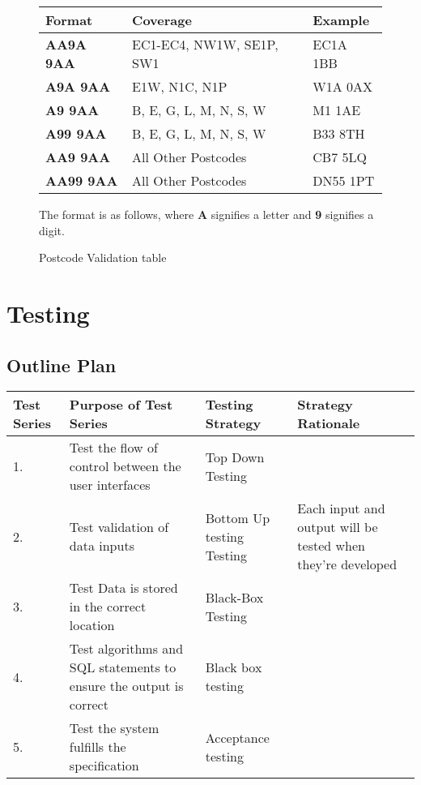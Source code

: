 \begin{python}
\pagebreak


\begin{figure}[H]
\caption{Postcode Validation table} \label{fig: Postcode Validation table}
\begin{tabular}{|p{2cm}|p{3cm}|p{2cm}|}
        \hline
        \textbf{Format} & \textbf{Coverage} & \textbf{Example} \\ \hline
        \textbf{AA9A 9AA} & EC1-EC4, NW1W, SE1P, SW1 & EC1A 1BB \\ \hline
        \textbf{A9A 9AA} & E1W, N1C, N1P & W1A 0AX \\ \hline
        \textbf{A9 9AA} & B, E, G, L, M, N, S, W & M1 1AE \\ \hline
         \textbf{A99 9AA} & B, E, G, L, M, N, S, W & B33 8TH \\ \hline
         \textbf{AA9 9AA} & All Other Postcodes & CB7 5LQ \\ \hline
         \textbf{AA99 9AA} & All Other Postcodes & DN55 1PT \\ \hline
  \end{tabular}
\par
\par
  The format is as follows, where \textbf{A} signifies a letter and \textbf{9} signifies a digit.
\end{figure}



\section{Testing}
\begin{landscape}

\subsection{Outline Plan}
\begin{center}
    \begin{tabular}{|p{2cm}|p{5cm}|p{5cm}|p{4cm}|}
        \hline
        \textbf{Test Series} & \textbf{Purpose of Test Series} & \textbf{Testing Strategy} & \textbf{Strategy Rationale}\\ \hline
	1. & Test the flow of control between the user interfaces & Top Down Testing &  \\ \hline
	2. & Test validation of data inputs & Bottom Up testing Testing &  Each input and output will be tested when they're developed\\ \hline
	3. & Test Data is stored in the correct location & Black-Box Testing & \\ \hline
	4. & Test algorithms and SQL statements to ensure the output is correct & Black box testing &\\ \hline
	5. & Test the system fulfills the specification & Acceptance testing & \\ \hline


\end{tabular}
\end{center}
\end{landscape}
\end{python}
